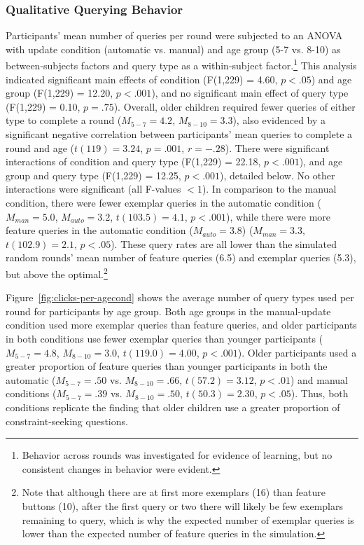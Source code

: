 \documentclass[man,floatsintext]{apa6}
\begin{document}
\subsubsection{Qualitative Querying Behavior}

Participants' mean number of queries per round were subjected to an ANOVA with update condition 
(automatic vs. manual) and age group (5-7 vs. 8-10) as between-subjects factors and query type as 
a within-subject factor.\footnote{Behavior across rounds was investigated for evidence of learning, but no consistent changes in behavior were evident.} This analysis indicated significant main effects of condition (F(1,229) = 4.60, $p<.05$) 
and age group (F(1,229) = 12.20, $p<.001$), and no significant main effect of query type 
(F(1,229) = 0.10, $p=.75$). Overall, older children required fewer queries of either type to complete a 
round ($M_{5-7} = 4.2$, $M_{8-10} = 3.3$), also evidenced by a significant negative correlation between participants' mean queries to complete a round and age ($t(119) = 3.24$, $p=.001$, $r=-.28$). There were significant interactions of condition 
and query type (F(1,229) = 22.18, $p<.001$), and age group and query type (F(1,229) = 12.25, 
$p<.001$), detailed below. No other interactions were significant (all F-values $<1$).  
In comparison to the manual condition, 
there were fewer exemplar queries in the automatic condition ($M_{man} = 5.0$, 
$M_{auto} = 3.2$, $t(103.5)=4.1$, $p<.001$), while there were more feature queries 
in the automatic condition ($M_{auto} = 3.8$) ($M_{man} = 3.3$, $t(102.9)=2.1$, 
$p<.05$).
These query rates are all lower than the simulated random rounds' mean number of feature queries (6.5) and exemplar queries (5.3), but above the optimal.\footnote{Note that although there are at first more exemplars (16) than feature buttons (10), after the first query or two there will likely be few 
exemplars remaining to query, which is why the expected number of exemplar 
queries is lower than the expected number of feature queries in the simulation.} 

Figure~\ref{fig:clicks-per-agecond} shows the average number of query types used per 
round for participants by age group. Both age groups in the manual-update condition used 
more exemplar queries than feature queries, and older participants in both conditions use fewer exemplar queries than younger participants ($M_{5-7}=4.8$, $M_{8-10}=3.0$, $t(119.0)=4.00$, $p<.001$). Older participants used a greater proportion of feature queries than younger participants in both the automatic ($M_{5-7}=.50$ vs. $M_{8-10}=.66$, $t(57.2)=3.12$, $p<.01$) 
and manual conditions ($M_{5-7}=.39$ vs. $M_{8-10}=.50$, $t(50.3)=2.30$, $p<.05$). Thus, both 
conditions replicate the  finding that older children use a greater proportion of 
constraint-seeking questions. 
\end{document}
